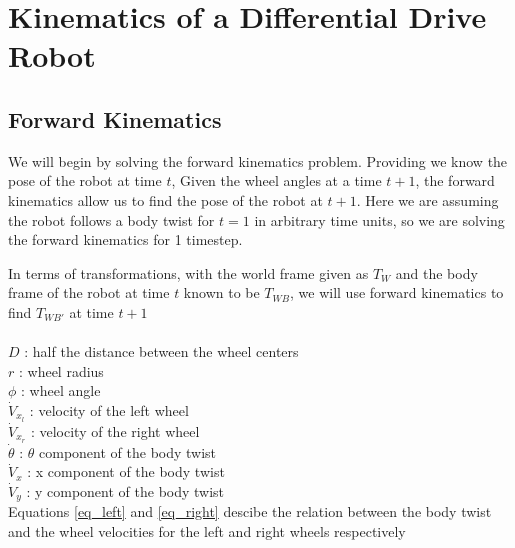 \documentclass{article}
\begin{document}
\section*{Kinematics of a Differential Drive Robot}
\subsection*{Forward Kinematics}
We will begin by solving the forward kinematics problem.
Providing we know the pose of the robot at time $t$,
Given the wheel angles at a time $t+1$,
the forward kinematics allow us to find the pose of the
robot at $t+1$. Here we are assuming the robot follows a body twist for $t=1$
in arbitrary time units, so we are solving the forward kinematics
for 1 timestep.

In terms of transformations, with the world frame given as $T_W$ and
the body frame of the robot at time $t$ known to be $T_{WB}$,
we will use forward kinematics to find $T_{WB'}$ at time $t+1$
\\
\\
$D$ : half the distance between the wheel centers \\
\vspace{1mm}
$r$ : wheel radius \\
\vspace{1mm}
$\phi$ : wheel angle \\
\vspace{1mm}
$\dot V_{x_l}$ : velocity of the left wheel \\
\vspace{1mm}
$\dot V_{x_r}$ : velocity of the right wheel \\
\vspace{1mm}
$\dot \theta$ : $\theta$ component of the body twist \\
\vspace{1mm}
$\dot V_{x}$ : x component of the body twist \\
\vspace{1mm}
$\dot V_{y}$ : y component of the body twist \\

\noindent
Equations \ref{eq_left} and \ref{eq_right} descibe the relation
between the body twist and the wheel velocities for the left and
right wheels respectively
\end{document}
